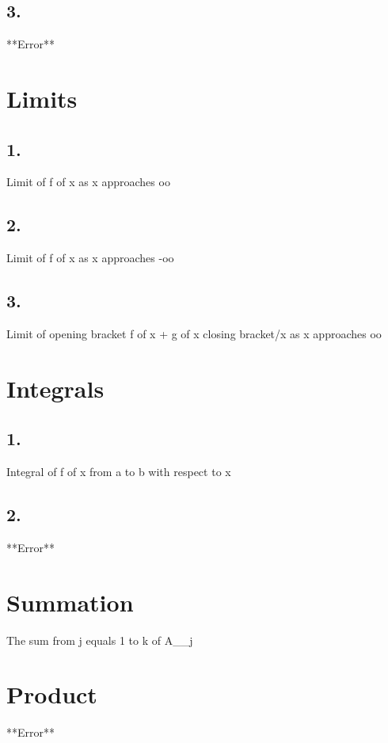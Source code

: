 \subsection*{3.}
**Error**

\section*{Limits}

\subsection*{1.}
Limit of f of x as x approaches oo

\subsection*{2.}
Limit of f of x as x approaches -oo

\subsection*{3.}
Limit of opening bracket f of x + g of x closing bracket/x as x approaches oo

\section*{Integrals}
\subsection*{1.}
Integral of f of x from a to b with respect to x

\subsection*{2.}
**Error**

\section*{Summation}

The sum from j equals 1 to k of A_{\alpha_j}




\section*{Product}
**Error**

